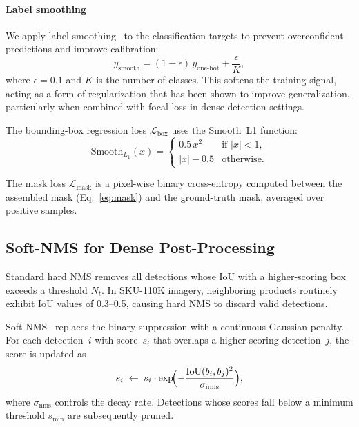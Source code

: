 \documentclass[conference]{IEEEtran}
\begin{document}
\paragraph{Label smoothing}
We apply label smoothing~\cite{szegedy2016rethinking} to the
classification targets to prevent overconfident predictions and improve
calibration:
\begin{equation}
  y_{\text{smooth}} = (1 - \epsilon)\,y_{\text{one-hot}} + \frac{\epsilon}{K},
  \label{eq:label_smooth}
\end{equation}
where $\epsilon = 0.1$ and $K$ is the number of classes. This softens
the training signal, acting as a form of regularization that has been
shown to improve generalization, particularly when combined with
focal loss in dense detection settings.

The bounding-box regression loss $\mathcal{L}_{\text{box}}$ uses the
Smooth~L1 function:
\begin{equation}
  \text{Smooth}_{L_1}(x) =
  \begin{cases}
    0.5\,x^{2}        & \text{if } |x| < 1, \\
    |x| - 0.5         & \text{otherwise}.
  \end{cases}
  \label{eq:smoothl1}
\end{equation}

The mask loss $\mathcal{L}_{\text{mask}}$ is a pixel-wise binary
cross-entropy computed between the assembled mask
(Eq.~\ref{eq:mask}) and the ground-truth mask, averaged over positive
samples.

\subsection{Soft-NMS for Dense Post-Processing}
\label{sec:softnms}

Standard hard NMS removes all detections whose IoU with a higher-scoring
box exceeds a threshold $N_t$. In SKU-110K imagery, neighboring products
routinely exhibit IoU values of 0.3--0.5, causing hard NMS to discard
valid detections.

Soft-NMS~\cite{bodla2017soft} replaces the binary suppression with a
continuous Gaussian penalty. For each detection~$i$ with score~$s_i$
that overlaps a higher-scoring detection~$j$, the score is updated as
\begin{equation}
  s_i \;\leftarrow\; s_i \cdot \exp\!\Bigl(-\frac{\text{IoU}(b_i, b_j)^{2}}{\sigma_{\text{nms}}}\Bigr),
  \label{eq:softnms}
\end{equation}
where $\sigma_{\text{nms}}$ controls the decay rate. Detections whose
scores fall below a minimum threshold $s_{\min}$ are subsequently pruned.
\end{document}
